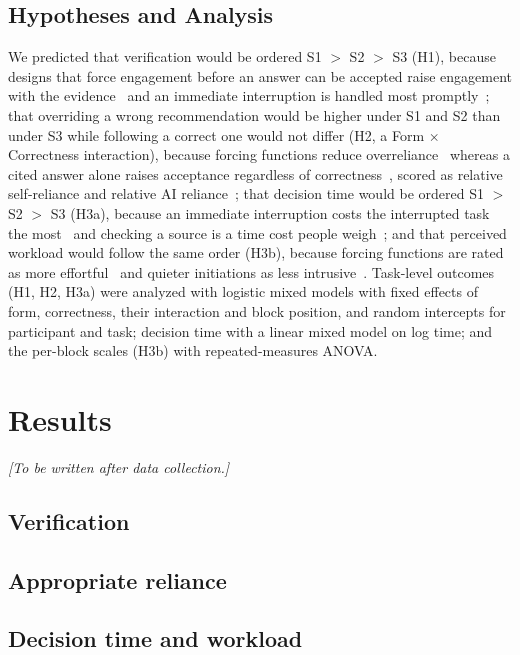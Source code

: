 \documentclass[manuscript,review]{acmart}
\newcommand{\todo}[1]{{\itshape\color{black!60}[#1]}}
\begin{document}
\subsection{Hypotheses and Analysis}
\label{sec:analysis}
We predicted that verification would be ordered S1 $>$ S2 $>$ S3 (H1),
because designs that force engagement before an answer can be accepted
raise engagement with the evidence~\cite{bucinca2021} and an immediate
interruption is handled most promptly~\cite{mcfarlane2002comparison};
that overriding a wrong recommendation would be higher under S1 and S2
than under S3 while following a correct one would not differ (H2, a Form
$\times$ Correctness interaction), because forcing functions reduce
overreliance~\cite{bucinca2021} whereas a cited answer alone raises
acceptance regardless of correctness~\cite{bansal2021}, scored as
relative self-reliance and relative AI reliance~\cite{schemmer2023}; that
decision time would be ordered S1 $>$ S2 $>$ S3 (H3a), because an
immediate interruption costs the interrupted task the
most~\cite{mcfarlane2002comparison} and checking a source is a time cost
people weigh~\cite{vasconcelos2023}; and that perceived workload would
follow the same order (H3b), because forcing functions are rated as more
effortful~\cite{bucinca2021} and quieter initiations as less
intrusive~\cite{sanchezadame2026}. Task-level outcomes (H1, H2, H3a) were
analyzed with logistic mixed models with fixed effects of form,
correctness, their interaction and block position, and random intercepts
for participant and task; decision time with a linear mixed model on log
time; and the per-block scales (H3b) with repeated-measures ANOVA.

\section{Results}
\label{sec:results}
\todo{To be written after data collection.}

\subsection{Verification}
\subsection{Appropriate reliance}
\subsection{Decision time and workload}
\end{document}
